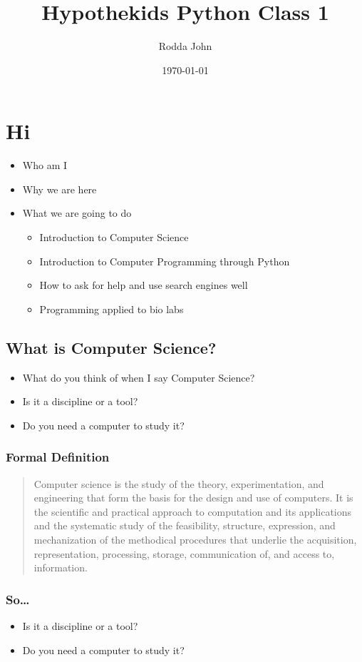 \documentclass[11pt]{article}
\author{Rodda John}
\date{\today}
\title{Hypothekids Python Class 1}
\begin{document}
\maketitle

\section{Hi}
\label{sec:org77151e9}
\begin{itemize}
\item Who am I
\item Why we are here
\item What we are going to do
\begin{itemize}
\item Introduction to Computer Science
\item Introduction to Computer Programming through Python
\item How to ask for help and use search engines well
\item Programming applied to bio labs
\end{itemize}
\end{itemize}
\subsection{What is Computer Science?}
\label{sec:org76acb0f}
\begin{itemize}
\item What do you think of when I say Computer Science?
\item Is it a discipline or a tool?
\item Do you need a computer to study it?
\end{itemize}
\subsubsection{Formal Definition}
\label{sec:org37a6b7f}
\begin{quote}
Computer science is the study of the theory, experimentation, and engineering that form the basis for the design and use of computers. It is the scientific and practical approach to computation and its applications and the systematic study of the feasibility, structure, expression, and mechanization of the methodical procedures that underlie the acquisition, representation, processing, storage, communication of, and access to, information.
\end{quote}
\subsubsection{So\ldots{}}
\label{sec:org39f3a93}
\begin{itemize}
\item Is it a discipline or a tool?
\item Do you need a computer to study it?
\end{itemize}
\end{document}
